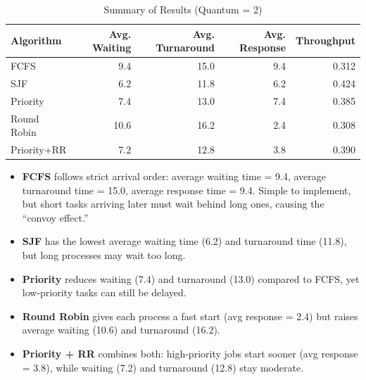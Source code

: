 \documentclass[conference]{IEEEtran}
\begin{document}
\begin{table}[H]
  \centering
  \caption{Summary of Results (Quantum = 2)}
  \label{tab:results}
  \begin{tabular}{lrrrr}
      \hline
      Algorithm       & Avg. Waiting & Avg. Turnaround & Avg. Response & Throughput \\
      \hline
      FCFS            & 9.4          & 15.0            & 9.4           & 0.312      \\
      SJF             & 6.2          & 11.8            & 6.2           & 0.424      \\
      Priority        & 7.4          & 13.0            & 7.4           & 0.385      \\
      Round Robin     & 10.6         & 16.2            & 2.4           & 0.308      \\
      Priority+RR     & 7.2          & 12.8            & 3.8           & 0.390      \\
      \hline
    \end{tabular}
\end{table}

\begin{itemize}
  \item \textbf{FCFS} follows strict arrival order: average waiting time = 9.4, average turnaround time = 15.0, average response time = 9.4. Simple to implement, but short tasks arriving later must wait behind long ones, causing the “convoy effect.”
  \item \textbf{SJF} has the lowest average waiting time (6.2) and turnaround time (11.8), but long processes may wait too long.
  \item \textbf{Priority} reduces waiting (7.4) and turnaround (13.0) compared to FCFS, yet low-priority tasks can still be delayed.
  \item \textbf{Round Robin} gives each process a fast start (avg response = 2.4) but raises average waiting (10.6) and turnaround (16.2).
  \item \textbf{Priority + RR} combines both: high-priority jobs start sooner (avg response = 3.8), while waiting (7.2) and turnaround (12.8) stay moderate.
\end{itemize}
\end{document}
